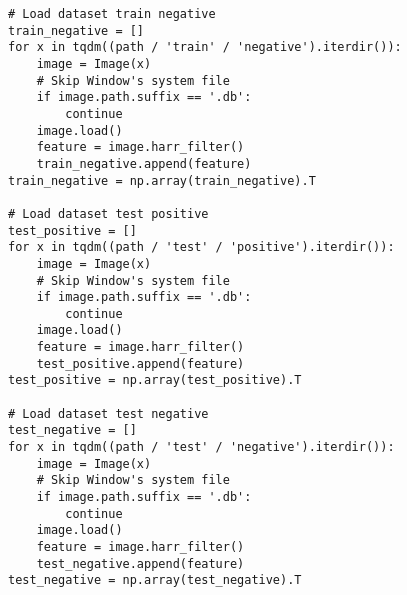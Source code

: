 \documentclass[11pt]{article}
\begin{document}
\begin{lstlisting}
# Load dataset train negative
train_negative = []
for x in tqdm((path / 'train' / 'negative').iterdir()):
    image = Image(x)
    # Skip Window's system file 
    if image.path.suffix == '.db':
        continue
    image.load()
    feature = image.harr_filter()
    train_negative.append(feature)
train_negative = np.array(train_negative).T

# Load dataset test positive
test_positive = []
for x in tqdm((path / 'test' / 'positive').iterdir()):
    image = Image(x)
    # Skip Window's system file 
    if image.path.suffix == '.db':
        continue
    image.load()
    feature = image.harr_filter()
    test_positive.append(feature)
test_positive = np.array(test_positive).T

# Load dataset test negative
test_negative = []
for x in tqdm((path / 'test' / 'negative').iterdir()):
    image = Image(x)
    # Skip Window's system file 
    if image.path.suffix == '.db':
        continue
    image.load()
    feature = image.harr_filter()
    test_negative.append(feature)
test_negative = np.array(test_negative).T


\end{lstlisting}
\end{document}
